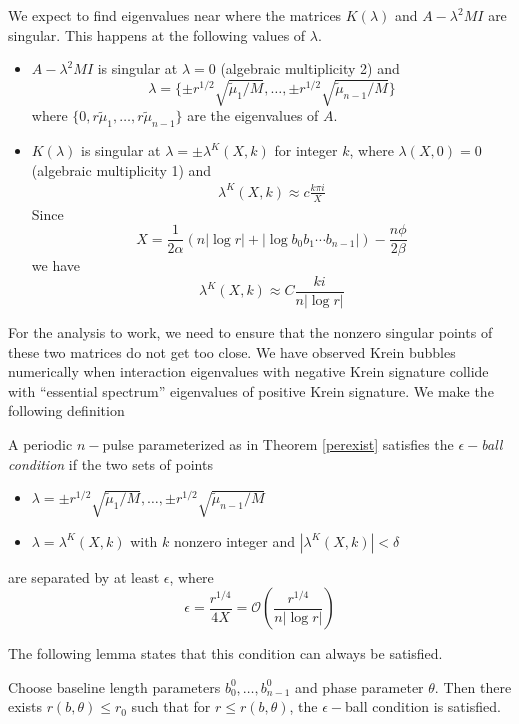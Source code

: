 \documentclass[thesis.tex]{subfiles}
\begin{document}
We expect to find eigenvalues near where the matrices $K(\lambda)$ and $A - \lambda^2 MI$ are singular. This happens at the following values of $\lambda$. 
\begin{itemize}
	\item $A - \lambda^2 M I$ is singular at $\lambda = 0$ (algebraic multiplicity 2) and 
	\[
	\lambda = \{ \pm r^{1/2} \sqrt{\tilde{\mu}_1/M}, \dots, \pm r^{1/2} \sqrt{\tilde{\mu}_{n-1}/M}\}
	\]
	where $\{0, r \tilde{\mu}_1, \dots, r \tilde{\mu}_{n-1}\}$ are the eigenvalues of $A$. 

	\item $K(\lambda)$ is singular at $\lambda = \pm \lambda^K(X,k)$ for integer $k$, where $\lambda(X, 0) = 0$ (algebraic multiplicity 1) and
	\begin{align}\label{lambdaXkapprox}
	\lambda^K(X,k) \approx c \frac{k \pi i }{X} 
	\end{align}
	Since 
	\[
	X = \frac{1}{2\alpha} (n |\log r| + |\log b_0 b_1 \cdots b_{n-1}| ) - \frac{n \phi}{2 \beta}
	\]
	we have
	\[
	\lambda^K(X,k) \approx C \frac{k i}{n |\log r|}
	\]
\end{itemize}  

For the analysis to work, we need to ensure that the nonzero singular points of these two matrices do not get too close. We have observed Krein bubbles numerically when interaction eigenvalues with negative Krein signature collide with ``essential spectrum'' eigenvalues of positive Krein signature. We make the following definition

\begin{definition}\label{epsilonballs}
A periodic $n-$pulse parameterized as in Theorem \ref{perexist} satisfies the \emph{$\epsilon-$ball condition} if the two sets of points 
\begin{itemize}
\item $\lambda = \pm r^{1/2} \sqrt{\tilde{\mu}_1/M}, \dots, \pm r^{1/2} \sqrt{\tilde{\mu}_{n-1}/M}$
\item $\lambda = \lambda^K(X,k)$ with $k$ nonzero integer and $|\lambda^K(X,k)| < \delta$
\end{itemize}
are separated by at least $\epsilon$, where
\[
\epsilon = \frac{r^{1/4}}{4X} = \mathcal{O} \left( \frac{r^{1/4}}{n |\log r| } \right)
\]
\end{definition}

The following lemma states that this condition can always be satisfied.

\begin{lemma}\label{epsilonballlemma}
Choose baseline length parameters $b_0^0, \dots, b_{n-1}^0$ and phase parameter $\theta$. Then there exists $r(b, \theta) \leq r_0$ such that for $r \leq r(b, \theta)$, the $\epsilon-$ball condition is satisfied.
\end{lemma} 
\end{document}
